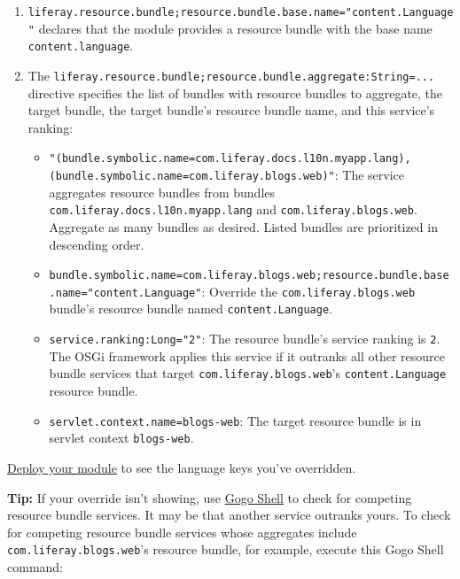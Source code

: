 \begin{enumerate}
\def\labelenumi{\arabic{enumi}.}
\item
  \texttt{liferay.resource.bundle;resource.bundle.base.name="content.Language"}
  declares that the module provides a resource bundle with the base name
  \texttt{content.language}.
\item
  The
  \texttt{liferay.resource.bundle;resource.bundle.aggregate:String=...}
  directive specifies the list of bundles with resource bundles to
  aggregate, the target bundle, the target bundle's resource bundle
  name, and this service's ranking:

  \begin{itemize}
  \tightlist
  \item
    \texttt{"(bundle.symbolic.name=com.liferay.docs.l10n.myapp.lang),(bundle.symbolic.name=com.liferay.blogs.web)"}:
    The service aggregates resource bundles from bundles
    \texttt{com.liferay.docs.l10n.myapp.lang} and
    \texttt{com.liferay.blogs.web}. Aggregate as many bundles as
    desired. Listed bundles are prioritized in descending order.
  \item
    \texttt{bundle.symbolic.name=com.liferay.blogs.web;resource.bundle.base.name="content.Language"}:
    Override the \texttt{com.liferay.blogs.web} bundle's resource bundle
    named \texttt{content.Language}.
  \item
    \texttt{service.ranking:Long="2"}: The resource bundle's service
    ranking is \texttt{2}. The OSGi framework applies this service if it
    outranks all other resource bundle services that target
    \texttt{com.liferay.blogs.web}'s \texttt{content.Language} resource
    bundle.
  \item
    \texttt{servlet.context.name=blogs-web}: The target resource bundle
    is in servlet context \texttt{blogs-web}.
  \end{itemize}
\end{enumerate}

\href{/docs/7-2/reference/-/knowledge_base/r/deploying-a-project}{Deploy
your module} to see the language keys you've overridden.

\noindent\hrulefill

\textbf{Tip:} If your override isn't showing, use
\href{/docs/7-2/customization/-/knowledge_base/c/using-the-felix-gogo-shell}{Gogo
Shell} to check for competing resource bundle services. It may be that
another service outranks yours. To check for competing resource bundle
services whose aggregates include \texttt{com.liferay.blogs.web}'s
resource bundle, for example, execute this Gogo Shell command:

